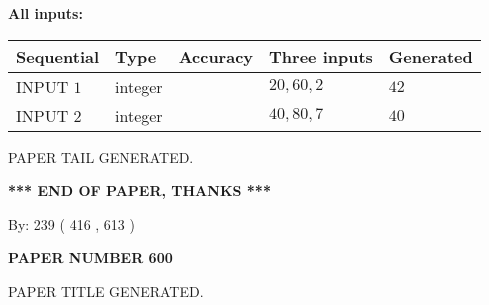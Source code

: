 \documentclass[12pt]{article}
\begin{document}
   
   
   
\noindent\vspace{0.1in}\hspace{-0.08in} {\textbf{\Large{All inputs: }}}
   
   
  
  
\noindent\begin{tabular}{|l|l|l|l|l|}
\hline
 Sequential & Type & Accuracy & Three inputs & Generated \\ 
\hline
 
 
  INPUT $  1 $ & integer &  & $
 20
 , 
 60
 , 
 2
 $ & $ 42 $ 
 \\  \hline  
 
 
  INPUT $  2 $ & integer &  & $
 40
 , 
 80
 , 
 7
 $ & $ 40 $ 
 \\  \hline  
 \end{tabular}
   
   
   
   
   
   
 \vspace{0.2in}
 
   
   
\vspace{2.0in} PAPER TAIL GENERATED.
   
   
   
   
\vspace{1.0in} 
{\textbf{\large{ *** END OF PAPER, THANKS *** }}} 
   
   
\hspace{1.0in} By: 
 239 ( 416 ,  613 )
   
   
   
   
\newpage 
\setcounter{page}{ 
   600001 } 
   
   
   
   
 {\textbf{ \Large{ PAPER NUMBER  600  }}}
   
   
\vspace{0.2in}
   
   
   
   
   
   
   
   
 \vspace{0.2in}
 
 
 
 
   
   
 PAPER TITLE GENERATED.
   
   
   
\vspace{0.2in}
   
\end{document}
